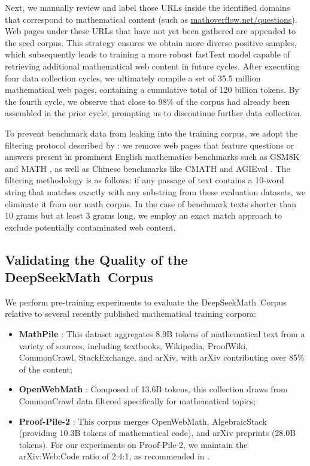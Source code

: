 Next, we manually review and label those URLs inside the identified domains that correspond to mathematical content (such as \url{mathoverflow.net/questions}). Web pages under these URLs that have not yet been gathered are appended to the seed corpus. This strategy ensures we obtain more diverse positive samples, which subsequently leads to training a more robust fastText model capable of retrieving additional mathematical web content in future cycles. After executing four data collection cycles, we ultimately compile a set of 35.5 million mathematical web pages, containing a cumulative total of 120 billion tokens. By the fourth cycle, we observe that close to 98\% of the corpus had already been assembled in the prior cycle, prompting us to discontinue further data collection.

To prevent benchmark data from leaking into the training corpus, we adopt the filtering protocol described by \cite{deepseek-coder}: we remove web pages that feature questions or answers present in prominent English mathematics benchmarks such as GSM8K \citep{gsm8k} and MATH \citep{MATH}, as well as Chinese benchmarks like CMATH \citep{wei2023cmath} and AGIEval \citep{agieval}. The filtering methodology is as follows: if any passage of text contains a 10-word string that matches exactly with any substring from these evaluation datasets, we eliminate it from our math corpus. In the case of benchmark texts shorter than 10 grams but at least 3 grams long, we employ an exact match approach to exclude potentially contaminated web content.

\subsection{Validating the Quality of the DeepSeekMath~Corpus}

We perform pre-training experiments to evaluate the DeepSeekMath~Corpus relative to several recently published mathematical training corpora:

\begin{itemize}[topsep=0pt]
    \item \textbf{MathPile} \citep{mathpile}: This dataset aggregates 8.9B tokens of mathematical text from a variety of sources, including textbooks, Wikipedia, ProofWiki, CommonCrawl, StackExchange, and arXiv, with arXiv contributing over 85\% of the content;
    \item \textbf{OpenWebMath} \citep{openwebmath}: Composed of 13.6B tokens, this collection draws from CommonCrawl data filtered specifically for mathematical topics;
    \item \textbf{Proof-Pile-2} \citep{llemma}: This corpus merges OpenWebMath, AlgebraicStack (providing 10.3B tokens of mathematical code), and arXiv preprints (28.0B tokens). For our experiments on Proof-Pile-2, we maintain the arXiv:Web:Code ratio of 2:4:1, as recommended in \cite{llemma}.
\end{itemize}

